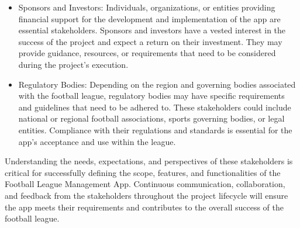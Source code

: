 \documentclass[12pt]{article}
\begin{document}
\begin{itemize}
    \item Sponsors and Investors: Individuals, organizations, or entities providing financial support for the development and implementation of the app are essential stakeholders. Sponsors and investors have a vested interest in the success of the project and expect a return on their investment. They may provide guidance, resources, or requirements that need to be considered during the project's execution.

    \item Regulatory Bodies: Depending on the region and governing bodies associated with the football league, regulatory bodies may have specific requirements and guidelines that need to be adhered to. These stakeholders could include national or regional football associations, sports governing bodies, or legal entities. Compliance with their regulations and standards is essential for the app's acceptance and use within the league.
\end{itemize}
Understanding the needs, expectations, and perspectives of these stakeholders is critical for successfully defining the scope, features, and functionalities of the Football League Management App. Continuous communication, collaboration, and feedback from the stakeholders throughout the project lifecycle will ensure the app meets their requirements and contributes to the overall success of the football league.
\end{document}
